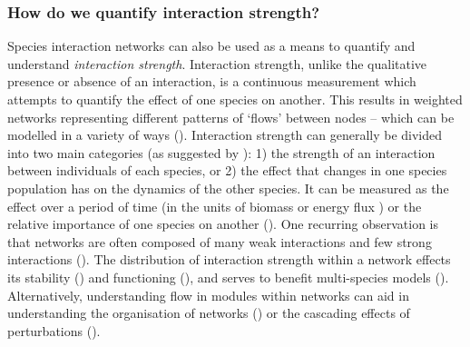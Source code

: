 \begin{refsection}
\subsubsection{How do we quantify interaction
strength?}\label{how-do-we-quantify-interaction-strength}

Species interaction networks can also be used as a means to quantify and
understand \emph{interaction strength}. Interaction strength, unlike the
qualitative presence or absence of an interaction, is a continuous
measurement which attempts to quantify the effect of one species on
another. This results in weighted networks representing different
patterns of `flows' between nodes -- which can be modelled in a variety
of ways (\cite{Borrett2019WalPar}). Interaction strength can generally be
divided into two main categories (as suggested by \cite{Berlow2004IntStr}): 1)
the strength of an interaction between individuals of each species, or
2) the effect that changes in one species population has on the dynamics
of the other species. It can be measured as the effect over a period of
time (in the units of biomass or energy flux \cite{Barnes2018EneFlu,
Brown2004MetThe}) or the relative importance of one species on
another (\cite{Heleno2014EcoNet, Berlow2004IntStr, Wootton2005MeaInt}).
One recurring observation is that networks are often composed of many
weak interactions and few strong interactions (\cite{Berlow2004IntStr}).
The distribution of interaction strength within a network effects its
stability (\cite{Neutel2002Stability, Ruiter1995EnePat}) and functioning
(\cite{Duffy2002BioEco, Montoya2003FooWeb}), and serves to benefit
multi-species models (\cite{Wootton2005MeaInt}). Alternatively,
understanding flow in modules within networks can aid in understanding
the organisation of networks (\cite{Farage2021IdeFlo, Montoya2002SmaWor})
or the cascading effects of perturbations (\cite{Gaiarsa2019IntStr}).


\end{refsection}
